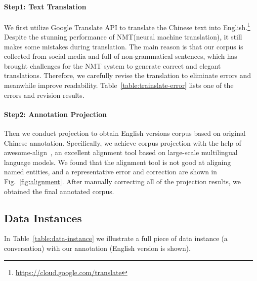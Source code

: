 \documentclass[11pt]{article}
\begin{document}
\paragraph{Step1: Text Translation}
We first utilize Google Translate API to translate the Chinese text into English.\footnote{\url{https://cloud.google.com/translate}}
Despite the stunning performance of NMT(neural machine translation), it still makes some mistakes during translation.
The main reason is that our corpus is collected from social media and full of non-grammatical sentences, which has brought challenges for the NMT system to generate correct and elegant translations.
Therefore, we carefully revise the translation to eliminate errors and meanwhile improve readability.
Table~\ref{table:trainslate-error} lists one of the errors and revision results.

\paragraph{Step2: Annotation Projection}
Then we conduct projection to obtain English versions corpus based on original Chinese annotation.
Specifically, we achieve corpus projection with the help of awesome-align~\cite{dou-neubig-2021-word}, an excellent alignment tool based on large-scale multilingual language models.
We found that the alignment tool is not good at aligning named entities, and a representative error and correction are shown in Fig.~\ref{fig:alignment}.
After manually correcting all of the projection results, we obtained the final annotated corpus.

\subsection{Data Instances}
In Table~\ref{table:data-instance} we illustrate a full piece of data instance (a conversation) with our annotation (English version is shown).
\end{document}
